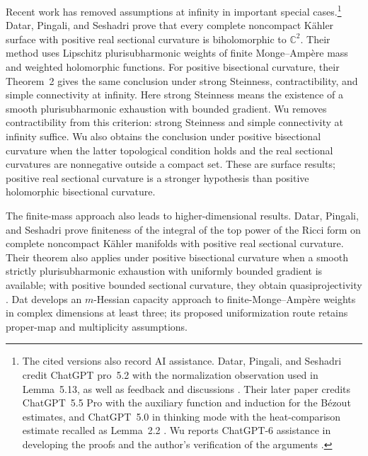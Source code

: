 \documentclass[11pt]{article}
\theoremstyle{definition}
\theoremstyle{remark}
\numberwithin{equation}{section}
\begin{document}
Recent work has removed assumptions at infinity in important special
cases.\footnote{The cited versions also record AI assistance.
Datar, Pingali, and Seshadri credit ChatGPT pro~5.2 with the normalization
observation used in Lemma~5.13, as well as feedback and discussions
\cite[Section~1.1 and Acknowledgments]{DatarPingaliSeshadri}.
Their later paper credits ChatGPT~5.5 Pro with the auxiliary function
and induction for the B\'ezout estimates, and ChatGPT~5.0 in thinking
mode with the heat-comparison estimate recalled as Lemma~2.2
\cite[Sections~1--3]{DatarPingaliSeshadriTop}.
Wu reports ChatGPT-6 assistance in developing the proofs and the
author's verification of the arguments
\cite[Acknowledgments]{WuConditional}.}
Datar, Pingali, and Seshadri
\cite[Theorem~1]{DatarPingaliSeshadri} prove that every complete noncompact
K\"ahler surface with positive real sectional curvature is biholomorphic
to $\mathbb C^2$. Their method uses Lipschitz plurisubharmonic weights of
finite Monge--Amp\`ere mass and weighted holomorphic functions.
For positive bisectional curvature, their Theorem~2 gives the same
conclusion under strong Steinness, contractibility, and simple
connectivity at infinity. Here strong Steinness means the existence of
a smooth plurisubharmonic exhaustion with bounded gradient.
Wu \cite[Corollaries~1.5--1.6]{WuConditional} removes contractibility
from this criterion: strong Steinness and simple connectivity at infinity
suffice. Wu also obtains the conclusion under positive bisectional curvature
when the latter topological condition holds and the real sectional
curvatures are nonnegative outside a compact set. These are surface results; positive real sectional
curvature is a stronger hypothesis than positive holomorphic bisectional
curvature.

The finite-mass approach also leads to higher-dimensional results.
Datar, Pingali, and Seshadri \cite[Theorem~1.1]{DatarPingaliSeshadriTop}
prove finiteness of the integral of the top power of the Ricci form on
complete noncompact K\"ahler manifolds with positive real sectional
curvature. Their theorem also applies under positive bisectional
curvature when a smooth strictly plurisubharmonic exhaustion with
uniformly bounded gradient is available; with positive bounded sectional
curvature, they obtain quasiprojectivity
\cite[Theorem~1.2]{DatarPingaliSeshadriTop}.
Dat \cite{DatHessian} develops an $m$-Hessian capacity approach to
finite-Monge--Amp\`ere weights in complex dimensions at least three;
its proposed uniformization route retains proper-map and multiplicity
assumptions.
\end{document}

